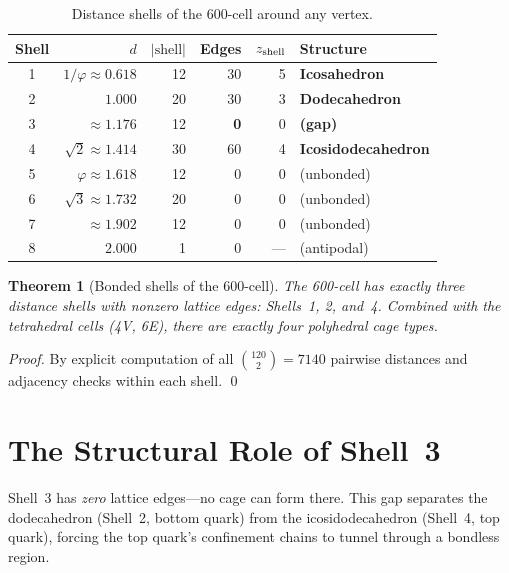 \documentclass[11pt,letterpaper]{article}
\newtheorem{theorem}{Theorem}[section]
\newcommand{\phig}{\varphi}
\begin{document}
\begin{table}[H]
\centering
\caption{Distance shells of the 600-cell around any vertex.}
\label{tab:shells}
\begin{tabular}{@{}crrrrl@{}}
\toprule
Shell & $d$ & $|\text{shell}|$ & Edges & $z_{\rm shell}$ & Structure \\
\midrule
1 & $1/\phig \approx 0.618$ & 12 & 30 & 5 & \textbf{Icosahedron} \\
2 & $1.000$ & 20 & 30 & 3 & \textbf{Dodecahedron} \\
3 & $\approx 1.176$ & 12 & \textbf{0} & 0 & \textbf{(gap)} \\
4 & $\sqrt{2} \approx 1.414$ & 30 & 60 & 4 & \textbf{Icosidodecahedron} \\
5 & $\phig \approx 1.618$ & 12 & 0 & 0 & (unbonded) \\
6 & $\sqrt{3} \approx 1.732$ & 20 & 0 & 0 & (unbonded) \\
7 & $\approx 1.902$ & 12 & 0 & 0 & (unbonded) \\
8 & $2.000$ & 1 & 0 & --- & (antipodal) \\
\bottomrule
\end{tabular}
\end{table}

\begin{theorem}[Bonded shells of the 600-cell]
\label{thm:shells}
The 600-cell has exactly three distance shells with nonzero lattice
edges: Shells~1, 2, and~4.  Combined with the tetrahedral cells
(4V, 6E), there are exactly four polyhedral cage types.
\end{theorem}

\begin{proof}
By explicit computation of all $\binom{120}{2} = 7140$ pairwise
distances and adjacency checks within each shell. \qed
\end{proof}

\section{The Structural Role of Shell~3}
\label{sec:shell3}

Shell~3 has \emph{zero} lattice edges---no cage can form there.
This gap separates the dodecahedron (Shell~2, bottom quark) from
the icosidodecahedron (Shell~4, top quark), forcing the top quark's
confinement chains to tunnel through a bondless region.
\end{document}
